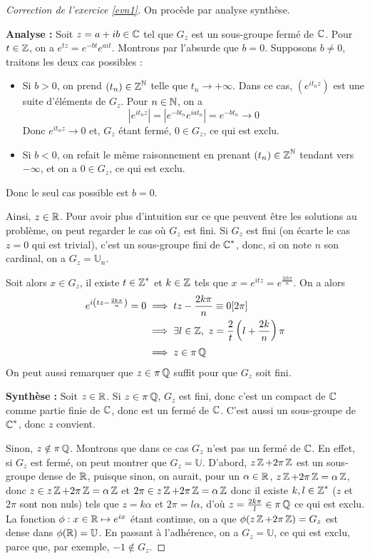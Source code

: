 \begin{proof}[Correction de l'exercice \ref{evn1}]
On procède par analyse synthèse.


\textbf{Analyse :} Soit $z=a+ib\in\operatorname{\mathbb C}$ tel que $G_z$ est un sous-groupe fermé de $\operatorname{\mathbb C}$.
Pour $t\in\operatorname{\mathbb Z}$, on a $e^{tz}=e^{-bt}e^{ait}$. 
Montrons par l'absurde que $b=0$.
Supposons $b\neq 0$, traitons les deux cas possibles : 
\begin{itemize}
	\item Si $b > 0$, on prend $(t_n)\in\operatorname{\mathbb Z}^{\operatorname{\mathbb N}}$ telle que $t_n\longrightarrow +\infty$. 
    Dans ce cas, $(e^{it_nz})$ est une suite d'éléments de $G_z$. 
    Pour $n\in\operatorname{\mathbb N}$, on a \[|e^{it_nz}|=|e^{-bt_n}e^{iat_n}|=e^{-bt_n}\longrightarrow 0\]
	Donc $e^{it_nz}\longrightarrow 0$ et, $G_z$ étant fermé, $0\in G_z$, ce qui est exclu.
	\item Si $b < 0$, on refait le même raisonnement en prenant $(t_n)\in\operatorname{\mathbb Z}^{\operatorname{\mathbb N}}$ tendant vers $-\infty$, et on a $0\in G_z$, ce qui est exclu.
\end{itemize}
Donc le seul cas possible est $b=0$.


Ainsi, $z\in\operatorname{\mathbb R}$. 
Pour avoir plus d'intuition sur ce que peuvent être les solutions au problème, on peut regarder le cas où $G_z$ est fini.
Si $G_z$ est fini (on écarte le cas $z=0$ qui est trivial), c'est un sous-groupe fini de $\operatorname{\mathbb C}^*$, donc, si on note $n$ son cardinal, on a $G_z=\mathbb U_n$.

Soit alors $x\in G_z$, il existe $t\in\operatorname{\mathbb Z}^*$ et $k\in\operatorname{\mathbb Z}$ tels que $x=e^{itz}=e^{\frac{2ik\pi}n}$. On a alors 
\begin{align*}
	e^{i\left(tz-\frac{2k\pi}n\right)} = 0 &\implies tz - \frac{2k\pi}n\equiv 0[2\pi]\\
										   &\implies \exists l\in\operatorname{\mathbb Z},\ z=\frac2t\left(l+\frac{2k}n\right)\pi\\
										   &\implies z\in\pi\operatorname{\mathbb Q}
\end{align*}
On peut aussi remarquer que $z\in\pi\operatorname{\mathbb Q}$ suffit pour que $G_z$ soit fini. 


\textbf{Synthèse :} Soit $z\in\operatorname{\mathbb R}$.
Si $z\in\pi\operatorname{\mathbb Q}$, $G_z$ est fini, donc c'est un compact de $\operatorname{\mathbb C}$ comme partie finie de $\operatorname{\mathbb C}$,
donc est un fermé de $\operatorname{\mathbb C}$. C'est aussi un sous-groupe de $\operatorname{\mathbb C}^*$, donc $z$ convient.


Sinon, $z\notin\pi\operatorname{\mathbb Q}$. Montrons que dans ce cas $G_z$ n'est pas un fermé de $\operatorname{\mathbb C}$.
En effet, si $G_z$ est fermé, on peut montrer que $G_z=\mathbb U$. 
D'abord, $z\operatorname{\mathbb Z}+2\pi\operatorname{\mathbb Z}$ est un sous-groupe dense de $\operatorname{\mathbb R}$, puisque sinon, 
on aurait, pour un $\alpha\in\operatorname{\mathbb R}$, $z\operatorname{\mathbb Z}+2\pi\operatorname{\mathbb Z}=\alpha\operatorname{\mathbb Z}$, donc $z\in z\operatorname{\mathbb Z}+2\pi\operatorname{\mathbb Z}=\alpha\operatorname{\mathbb Z}$
et $2\pi\in z\operatorname{\mathbb Z}+2\pi\operatorname{\mathbb Z}=\alpha\operatorname{\mathbb Z}$ donc il existe $k,l\in\operatorname{\mathbb Z}^*$ ($z$ et $2\pi$ sont non nuls) 
tels que $z=k\alpha$ et $2\pi=l\alpha$, d'où $z=\frac{2k\pi}l\in\pi\operatorname{\mathbb Q}$ ce qui est exclu. 
La fonction $\phi:x\in\operatorname{\mathbb R}\mapsto e^{ix}$ étant continue, on a que $\phi(z\operatorname{\mathbb Z}+2\pi\operatorname{\mathbb Z})=G_z$ est dense dans $\phi(\operatorname{\mathbb R})=\mathbb U$. 
En passant à l'adhérence, on a $G_z=\mathbb U$, ce qui est exclu, parce que, par exemple, $-1\notin G_z$.
\end{proof}

